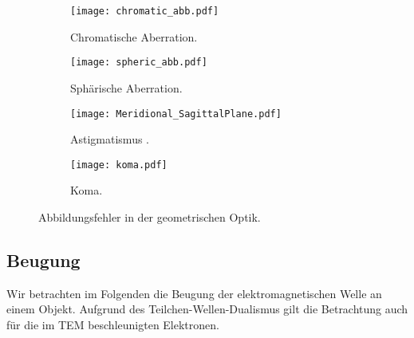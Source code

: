 \begin{figure}[h]
	\centering
	\begin{subfigure}[b]{0.45\textwidth}
		\centering
		\texttt{[image: chromatic\_abb.pdf]}
		\caption{Chromatische Aberration.}
		\label{fig:chromatic_abb}
	\end{subfigure}
	\hfill
	\begin{subfigure}[b]{0.45\textwidth}
		\centering
		\texttt{[image: spheric\_abb.pdf]}
		\caption{Sphärische Aberration.}
		\label{fig:spheric_abb}
	\end{subfigure}
	
	\begin{subfigure}[b]{0.45\textwidth}
		\centering
		\texttt{[image: Meridional\_SagittalPlane.pdf]}
		\caption{Astigmatismus \cite{lit:wiki_astigma}.}
		\label{fig:astigmatismus}
	\end{subfigure}
	\hfill
	\begin{subfigure}[b]{0.45\textwidth}
		\centering
		\texttt{[image: koma.pdf]}
		\caption{Koma.}
		\label{fig:koma}
	\end{subfigure}
	\caption{Abbildungsfehler in der geometrischen Optik.}
\end{figure}
\subsection{Beugung}
Wir betrachten im Folgenden die Beugung der elektromagnetischen Welle an einem Objekt. Aufgrund des Teilchen-Wellen-Dualismus gilt die Betrachtung auch für die im TEM beschleunigten Elektronen.
